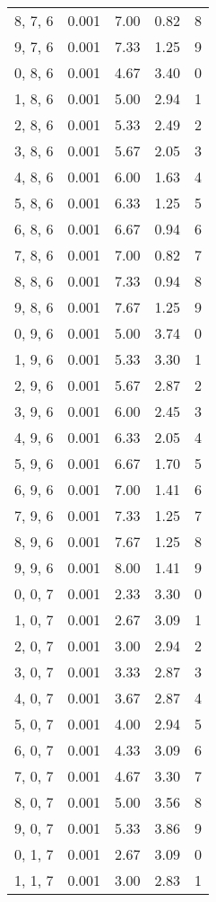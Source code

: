 \documentclass[12pt]{article}
\begin{document}
\begin{tabular}{c || c || c | c | c}
8, 7, 6 & 0.001 & 7.00 & 0.82 & 8 \\
9, 7, 6 & 0.001 & 7.33 & 1.25 & 9 \\
0, 8, 6 & 0.001 & 4.67 & 3.40 & 0 \\
1, 8, 6 & 0.001 & 5.00 & 2.94 & 1 \\
2, 8, 6 & 0.001 & 5.33 & 2.49 & 2 \\
3, 8, 6 & 0.001 & 5.67 & 2.05 & 3 \\
4, 8, 6 & 0.001 & 6.00 & 1.63 & 4 \\
5, 8, 6 & 0.001 & 6.33 & 1.25 & 5 \\
6, 8, 6 & 0.001 & 6.67 & 0.94 & 6 \\
7, 8, 6 & 0.001 & 7.00 & 0.82 & 7 \\
8, 8, 6 & 0.001 & 7.33 & 0.94 & 8 \\
9, 8, 6 & 0.001 & 7.67 & 1.25 & 9 \\
0, 9, 6 & 0.001 & 5.00 & 3.74 & 0 \\
1, 9, 6 & 0.001 & 5.33 & 3.30 & 1 \\
2, 9, 6 & 0.001 & 5.67 & 2.87 & 2 \\
3, 9, 6 & 0.001 & 6.00 & 2.45 & 3 \\
4, 9, 6 & 0.001 & 6.33 & 2.05 & 4 \\
5, 9, 6 & 0.001 & 6.67 & 1.70 & 5 \\
6, 9, 6 & 0.001 & 7.00 & 1.41 & 6 \\
7, 9, 6 & 0.001 & 7.33 & 1.25 & 7 \\
8, 9, 6 & 0.001 & 7.67 & 1.25 & 8 \\
9, 9, 6 & 0.001 & 8.00 & 1.41 & 9 \\
0, 0, 7 & 0.001 & 2.33 & 3.30 & 0 \\
1, 0, 7 & 0.001 & 2.67 & 3.09 & 1 \\
2, 0, 7 & 0.001 & 3.00 & 2.94 & 2 \\
3, 0, 7 & 0.001 & 3.33 & 2.87 & 3 \\
4, 0, 7 & 0.001 & 3.67 & 2.87 & 4 \\
5, 0, 7 & 0.001 & 4.00 & 2.94 & 5 \\
6, 0, 7 & 0.001 & 4.33 & 3.09 & 6 \\
7, 0, 7 & 0.001 & 4.67 & 3.30 & 7 \\
8, 0, 7 & 0.001 & 5.00 & 3.56 & 8 \\
9, 0, 7 & 0.001 & 5.33 & 3.86 & 9 \\
0, 1, 7 & 0.001 & 2.67 & 3.09 & 0 \\
1, 1, 7 & 0.001 & 3.00 & 2.83 & 1 \\

\end{tabular}
\end{document}
